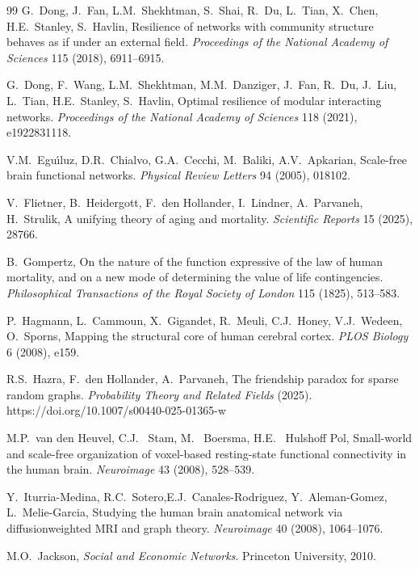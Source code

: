 \documentclass[11pt]{article}
\numberwithin{equation}{section}
\begin{document}
\begin{thebibliography}{99}
G.~Dong, J.~Fan, L.M.~Shekhtman, S.~Shai, R.~Du, L.~Tian, X.~Chen, H.E.~Stanley, S.~Havlin,
\newblock Resilience of networks with community structure behaves as if under an external field.
\newblock \emph{Proceedings of the National Academy of Sciences} 115 (2018), 6911--6915.

G.~Dong, F.~Wang, L.M.~Shekhtman, M.M.~Danziger, J.~Fan, R.~Du, J.~Liu, L.~Tian, H.E.~Stanley, S.~Havlin,
\newblock Optimal resilience of modular interacting networks.
\newblock \emph{Proceedings of the National Academy of Sciences} 118 (2021), e1922831118.


V.M.~Egu\'{\i}luz, D.R.~Chialvo, G.A.~Cecchi, M.~Baliki, A.V.~Apkarian,
\newblock Scale-free brain functional networks.
\newblock \emph{Physical Review Letters} 94 (2005), 018102.

V.~Flietner, B.~Heidergott, F.~den Hollander, I.~Lindner, A.~Parvaneh, H.~Strulik,
\newblock A unifying theory of aging and mortality. 
\newblock \emph{Scientific Reports} 15 (2025), 28766.

B.~Gompertz,
\newblock On the nature of the function expressive of the law of human mortality,
and on a new mode of determining the value of life contingencies.
\newblock \emph{Philosophical Transactions of the Royal Society of London} 115 (1825), 513--583.

P.~Hagmann, L.~Cammoun, X.~Gigandet, R.~Meuli, C.J.~Honey, V.J.~Wedeen, O.~Sporns,
\newblock Mapping the structural core of human cerebral cortex. 
\newblock \emph{PLOS Biology} 6 (2008), e159. 

R.S.~Hazra, F.~den Hollander, A.~Parvaneh,
\newblock The friendship paradox for sparse random graphs. 
\newblock \emph{Probability Theory and Related Fields} (2025). 
https://doi.org/10.1007/s00440-025-01365-w

M.P.~van den Heuvel, C.J.~ Stam, M.~ Boersma, H.E.~ Hulshoff Pol, 
\newblock Small-world and scale-free organization of voxel-based resting-state functional
connectivity in the human brain. 
\newblock \emph{Neuroimage} 43 (2008), 528--539.

Y.~Iturria-Medina, R.C.~Sotero,E.J.~Canales-Rodriguez, Y.~Aleman-Gomez, L.~Melie-Garcia,  \newblock Studying the human brain anatomical network via diffusionweighted MRI and graph theory. \newblock \emph{Neuroimage} 40 (2008), 1064--1076.

M.O.~Jackson,
\newblock \emph{Social and Economic Networks}.
\newblock  Princeton University, 2010.


\end{thebibliography}
\end{document}
